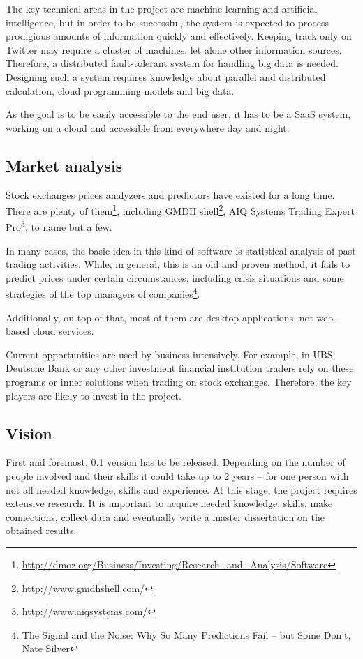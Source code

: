 \documentclass[a4paper,12pt]{article}
\begin{document}
The key technical areas in the project are machine learning and artificial intelligence, but in order to be successful, the system is expected to process prodigious amounts of information quickly and effectively. Keeping track only on Twitter may require a cluster of machines, let alone other information sources. Therefore, a distributed fault-tolerant system for handling big data is needed. Designing such a system requires knowledge about parallel and distributed calculation, cloud programming models and big data.

As the goal is to be easily accessible to the end user, it has to be a SaaS system, working on a cloud and accessible from everywhere day and night.

\subsection*{Market analysis}

Stock exchanges prices analyzers and predictors have existed for a long time. There are plenty of them\footnote{\url{http://dmoz.org/Business/Investing/Research\_and\_Analysis/Software}}, including GMDH shell\footnote{\url{http://www.gmdhshell.com/}}, AIQ Systems Trading Expert Pro\footnote{\url{http://www.aiqsystems.com/}}, to name but a few.

In many cases, the basic idea in this kind of software is statistical analysis of past trading activities. While, in general, this is an old and proven method, it fails to predict prices under certain circumstances, including crisis situations and some strategies of the top managers of companies\footnote{The Signal and the Noise: Why So Many Predictions Fail -- but Some Don't, Nate Silver}.

Additionally, on top of that, most of them are desktop applications, not web-based cloud services.

Current opportunities are used by business intensively. For example, in UBS, Deutsche Bank or any other investment financial institution traders rely on these programs or inner solutions when trading on stock exchanges. Therefore, the key players are likely to invest in the project.

\subsection*{Vision}

First and foremost, 0.1 version has to be released. Depending on the number of people involved and their skills it could take up to 2 years -- for one person with not all needed knowledge, skills and experience. At this stage, the project requires extensive research. It is important to acquire needed knowledge, skills, make connections, collect data and eventually write a master dissertation on the obtained results.
\end{document}
